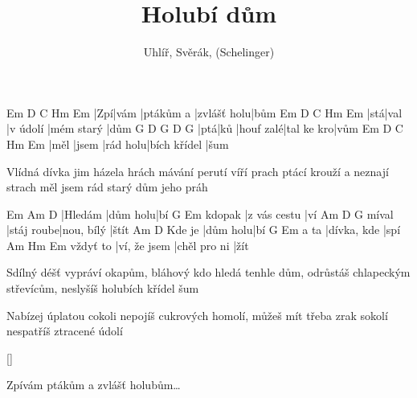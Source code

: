 \documentclass{song}
\title{Holubí dům}
\author{Uhlíř, Svěrák, (Schelinger)}
\begin{document}
\strophe
Em  D    C         Hm          Em
|Zpí|vám |ptákům a |zvlášť holu|bům
Em  D    C        Hm         Em
|stá|val |v údolí |mém starý |dům
G   D   G         D          G
|ptá|ků |houf zalé|tal ke kro|vům
Em   D     C        Hm           Em
|měl |jsem |rád holu|bích křídel |šum
\endstrophe

\strophe*
Vlídná dívka jim házela hrách
mávání perutí víří prach
ptácí krouží a neznají strach
měl jsem rád starý dům jeho práh 
\endstrophe

Em      Am       D
|Hledám |dům holu|bí
       G            Em
kdopak |z vás cestu |ví
      Am         D          G
míval |stáj roube|nou, bílý |štít
       Am       D
Kde je |dům holu|bí
     G           Em
a ta |dívka, kde |spí
         Am           Hm           Em
vždyť to |ví, že jsem |chěl pro ni |žít
\endstrophe

\strophe*
Sdílný déšť vypráví okapům,
bláhový kdo hledá tenhle dům,
odrůstáš chlapeckým střevícům,
neslyšíš holubích křídel šum
\endstrophe


\strophe*
Nabízej úplatou cokoli
nepojíš cukrových homolí,
můžeš mít třeba zrak sokolí
nespatříš ztracené údolí 
\endstrophe

\ref{}

\strophe*
Zpívám ptákům a zvlášť holubům\ldots
\endstrophe
\end{document}

